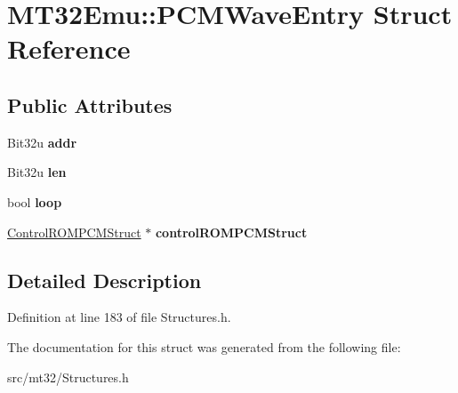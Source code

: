 \hypertarget{structMT32Emu_1_1PCMWaveEntry}{\section{M\-T32\-Emu\-:\-:P\-C\-M\-Wave\-Entry Struct Reference}
\label{structMT32Emu_1_1PCMWaveEntry}
}
\subsection*{Public Attributes}
\begin{DoxyCompactItemize}
\item 
\hypertarget{structMT32Emu_1_1PCMWaveEntry_a0d3df0278d2638db78c44d86a5d2697b}{Bit32u {\bfseries addr}}\label{structMT32Emu_1_1PCMWaveEntry_a0d3df0278d2638db78c44d86a5d2697b}

\item 
\hypertarget{structMT32Emu_1_1PCMWaveEntry_a2130305c04dbaf7fcbec5e04dff5d727}{Bit32u {\bfseries len}}\label{structMT32Emu_1_1PCMWaveEntry_a2130305c04dbaf7fcbec5e04dff5d727}

\item 
\hypertarget{structMT32Emu_1_1PCMWaveEntry_aec278bb723cf6d4871d2eb54ee6b0fc1}{bool {\bfseries loop}}\label{structMT32Emu_1_1PCMWaveEntry_aec278bb723cf6d4871d2eb54ee6b0fc1}

\item 
\hypertarget{structMT32Emu_1_1PCMWaveEntry_a0452e967a6621f0ea4f60fa0ef1f49a7}{\hyperlink{structMT32Emu_1_1ControlROMPCMStruct}{Control\-R\-O\-M\-P\-C\-M\-Struct} $\ast$ {\bfseries control\-R\-O\-M\-P\-C\-M\-Struct}}\label{structMT32Emu_1_1PCMWaveEntry_a0452e967a6621f0ea4f60fa0ef1f49a7}

\end{DoxyCompactItemize}


\subsection{Detailed Description}


Definition at line 183 of file Structures.\-h.



The documentation for this struct was generated from the following file\-:\begin{DoxyCompactItemize}
\item 
src/mt32/Structures.\-h\end{DoxyCompactItemize}
